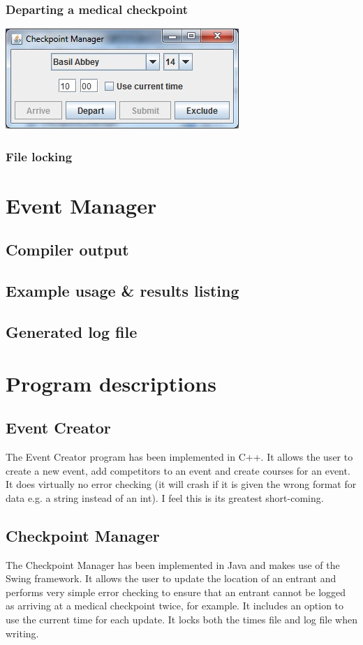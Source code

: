 \documentclass[a4paper, twoside]{article}
\begin{document}
\subsubsection{Departing a medical checkpoint}
\includegraphics{screenshot3.jpg}
\subsubsection{File locking}

\section{Event Manager}
\subsection{Compiler output}

\subsection{Example usage \& results listing}

\subsection{Generated log file}


\section{Program descriptions}
\subsection{Event Creator}
The Event Creator program has been implemented in C++. It allows the user to
create a new event, add competitors to an event and create courses for an event.
It does virtually no error checking (it will crash if it is given the wrong
format for data e.g. a string instead of an int). I feel this is its greatest
short-coming.
\subsection{Checkpoint Manager}
The Checkpoint Manager has been implemented in Java and makes use of the Swing
framework. It allows the user to update the location of an entrant and performs
very simple error checking to ensure that an entrant cannot be logged as
arriving at a medical checkpoint twice, for example. It includes an option to
use the current time for each update. It locks both the times file and log file
when writing.
\end{document}
